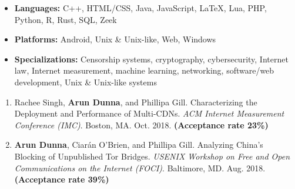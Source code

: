 
\begin{itemize}
  \item \textbf{Languages:} C++, HTML/CSS, Java, JavaScript, LaTeX, Lua, PHP, Python, R, Rust, SQL, Zeek
  \item \textbf{Platforms:} Android, Unix \& Unix-like, Web, Windows
  \item \textbf{Specializations:} Censorship systems, cryptography, cybersecurity, Internet law, Internet measurement, machine learning, networking, software/web development, Unix \& Unix-like systems

\end{itemize}


\begin{enumerate}
 \item Rachee Singh, \textbf{Arun Dunna}, and Phillipa Gill. Characterizing the Deployment and Performance of Multi-CDNs. \textit{ACM Internet Measurement Conference (IMC)}. Boston, MA. Oct. 2018. \textbf{(Acceptance rate 23\%)}
 \item \textbf{Arun Dunna}, Ciar\'an O'Brien, and Phillipa Gill. Analyzing China's Blocking of Unpublished Tor Bridges. \textit{USENIX Workshop on Free and Open Communications on the Internet (FOCI)}. Baltimore, MD. Aug. 2018. \textbf{(Acceptance rate 39\%)}
\end{enumerate}

\newpage


\begin{itemize}
  \setlength{\itemsep}{0pt}
\end{itemize}


\begin{itemize}
  \setlength{\itemsep}{0pt}
\end{itemize}


\begin{itemize}
  \setlength{\itemsep}{0pt}
\end{itemize}

